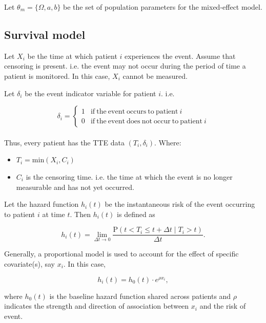 \documentclass[english]{article}
\theoremstyle{plain}
\begin{document}
Let $\theta_m = \{ \Omega, a, b \}$ be the set of population parameters for the mixed-effect model.



\subsection{Survival model}

Let $X_i$ be the time at which patient $i$ experiences the event. Assume that censoring is present. i.e. the event may not occur during the period of time a patient is monitored. In this case, $X_i$ cannot be measured.

Let $\delta_i$ be the event indicator variable for patient $i$. i.e.

$$
\delta_i = 
\begin{cases}
	1 & \mathrm{if\ the\ event\ occurs\ to\ patient}\  i \\
	0 & \mathrm{if\ the\ event\ does\ not\ occur\ to\ patient}\  i
\end{cases}
$$
\\

Thus, every patient has the TTE data $(T_i, \delta_i)$. Where:
\begin{itemize}
	\item $T_i = \mathrm{min}(X_i, C_i)$
	\item $C_i$ is the censoring time. i.e. the time at which the event is no longer measurable and has not yet occurred.
\end{itemize}

Let the hazard function $h_i(t)$ be the instantaneous risk of the event occurring to patient $i$ at time $t$. Then $h_i(t)$ is defined as

\begin{equation}
h_i(t) = \lim_{\Delta t \to 0} \frac{\mathrm{P}(t < T_i \le t + \Delta t \mid T_i > t)}{\Delta t}.
\end{equation}

Generally, a proportional model \cite{Marion2022} is used to account for the effect of specific covariate(s), say $x_i$. In this case,

\begin{equation}
h_i(t) = h_0(t) \cdot e^{\rho x_i},
\end{equation}

where $h_0(t)$ is the baseline hazard function shared across patients and $\rho$ indicates the strength and direction of association between $x_i$ and the risk of event.
\\
\end{document}
